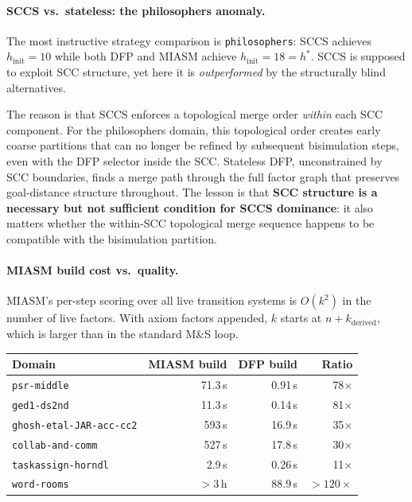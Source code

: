 \documentclass[11pt,a4paper]{article}
\begin{document}
\paragraph{SCCS vs.\ stateless: the philosophers anomaly.}

The most instructive strategy comparison is \texttt{philosophers}: SCCS
achieves $h_{\mathrm{init}} = 10$ while both DFP and MIASM achieve
$h_{\mathrm{init}} = 18 = h^*$.  SCCS is supposed to exploit SCC structure,
yet here it is \emph{outperformed} by the structurally blind alternatives.

The reason is that SCCS enforces a topological merge order \emph{within} each
SCC component.  For the philosophers domain, this topological order creates
early coarse partitions that can no longer be refined by subsequent bisimulation
steps, even with the DFP selector inside the SCC.  Stateless DFP, unconstrained
by SCC boundaries, finds a merge path through the full factor graph that
preserves goal-distance structure throughout.  The lesson is that
\textbf{SCC structure is a necessary but not sufficient condition for SCCS
dominance}: it also matters whether the within-SCC topological merge sequence
happens to be compatible with the bisimulation partition.

\paragraph{MIASM build cost vs.\ quality.}

MIASM's per-step scoring over all live transition systems is $O(k^2)$ in the
number of live factors.  With axiom factors appended, $k$ starts at
$n + k_{\mathrm{derived}}$, which is larger than in the standard M\&S loop.

\begin{center}
\small
\begin{tabular}{lrrr}
\toprule
\textbf{Domain} & \textbf{MIASM build} & \textbf{DFP build} & \textbf{Ratio} \\
\midrule
\texttt{psr-middle}         &  71.3\,s   &  0.91\,s & 78$\times$ \\
\texttt{ged1-ds2nd}         &  11.3\,s   &  0.14\,s & 81$\times$ \\
\texttt{ghosh-etal-JAR-acc-cc2} & 593\,s & 16.9\,s  & 35$\times$ \\
\texttt{collab-and-comm}    & 527\,s     & 17.8\,s  & 30$\times$ \\
\texttt{taskassign-horndl}  &   2.9\,s   &  0.26\,s & 11$\times$ \\
\texttt{word-rooms}         & $>3$\,h    &  88.9\,s & $>120\times$ \\
\bottomrule
\end{tabular}
\end{center}
\end{document}
